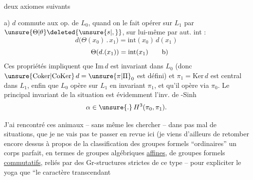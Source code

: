 deux axiomes suivants

a) $d$ commute aux op. de $L_0$, quand on le fait opérer sur $L_1$ par $\unsure{\Theta|\theta}\deleted{\unsure{s|,}}$, sur lui-même par aut. int :
\[
d\bigl(\Theta(x_0)\mathbin{.}x_1\bigr)=\mathrm{int}(x_0)\,d(x_1)
\]
\[
\Theta(d.(x_1))=\mathrm{int}(x_1)\tag*{\makebox[0pt][r]{\makebox[\displaywidth][l]{b)}}}
\]
Ces propriétés impliquent que $\mathrm{Im}\,d$ est invariant dans $L_0$ (donc $\unsure{\mathrm{Coker}|\mathrm{CoKer}}\,d=\unsure{\pi|\Pi}_0$ est défini) et $\pi_1=\mathrm{Ker}\,d$ est central dans $L_1$, enfin que $L_0$ opère sur $L_1$ en invariant $\pi_1$, et qu'il opère via $\pi_0$. Le principal invariant  de la situation est évidemment l'inv. de -Sinh
\[
\alpha\in\unsure{.}\,H^3(\pi_0,\pi_1).
\]

J'ai rencontré ces animaux -- sans même les chercher -- dans pas mal de situations, que je ne vais pas te passer en revue ici (je viens d'ailleurs de retomber encore dessus à propos de la classification des groupes formels ``ordinaires''  un corps parfait, en termes de groupes algébriques \uline{affines}, de groupes formels \uline{commutatifs}, reliés par des Gr-structures strictes de ce type%
 -- pour expliciter le yoga que ``le caractère transcendant 
